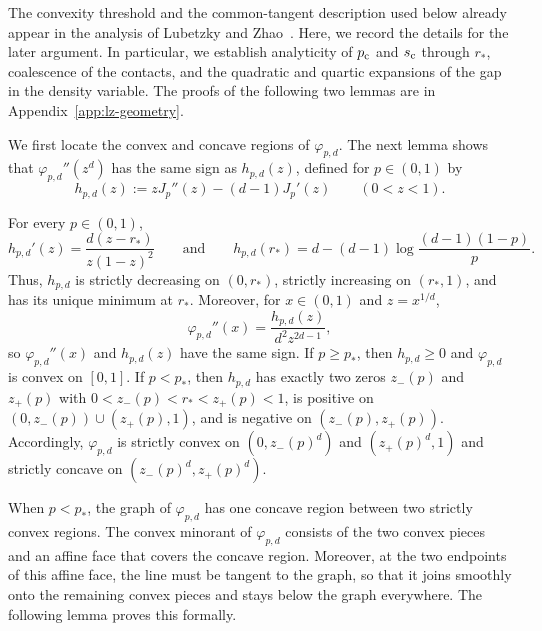 The convexity threshold and the common-tangent description used
below already appear in the analysis of Lubetzky and Zhao~\cite[Appendix~A]{lubetzky2015large}.
Here, we record the details for the later argument.  In particular, we establish
analyticity of $\pc$ and $\sc$ through $r_*$, coalescence of the contacts, and the
quadratic and quartic expansions of the gap in the density variable.
The proofs of the following two lemmas are in
Appendix~\ref{app:lz-geometry}.

We first locate the convex and concave regions of $\varphi_{p,d}$.
The next lemma shows that $\varphi_{p,d}''(z^d)$ has the same sign as
$h_{p,d}(z)$, defined for $p\in(0,1)$ by
\[
  h_{p,d}(z):=zJ_p''(z)-(d-1)J_p'(z)
  \qquad (0<z<1).
\]

\begin{lemma}\label{lem:convexity-defect}
For every $p\in(0,1)$,
\[
  h_{p,d}'(z)=\frac{d(z-r_*)}{z(1-z)^2}
  \qquad\text{and}\qquad
  h_{p,d}(r_*)=d-(d-1)\log\frac{(d-1)(1-p)}{p}.
\]
Thus, $h_{p,d}$ is strictly decreasing on $(0,r_*)$, strictly increasing on
$(r_*,1)$, and has its unique minimum at $r_*$.  Moreover, for
$x\in(0,1)$ and $z=x^{1/d}$,
\[
  \varphi_{p,d}''(x)=\frac{h_{p,d}(z)}{d^2z^{2d-1}},
\]
so $\varphi_{p,d}''(x)$ and $h_{p,d}(z)$ have the same sign.  If $p\ge p_*$,
then $h_{p,d}\ge0$ and $\varphi_{p,d}$ is convex on $[0,1]$.  If $p<p_*$,
then $h_{p,d}$ has exactly two zeros $z_-(p)$ and $z_+(p)$ with $0<z_-(p)<r_*<z_+(p)<1$,
is positive on $(0,z_-(p))\cup(z_+(p),1)$, and is negative on
$(z_-(p),z_+(p))$.  Accordingly, $\varphi_{p,d}$ is strictly convex on
$(0,z_-(p)^d)$ and $(z_+(p)^d,1)$ and strictly concave on
$(z_-(p)^d,z_+(p)^d)$.
\end{lemma}

When $p<p_*$, the graph of $\varphi_{p,d}$ has one concave region between two strictly convex regions.
The convex minorant of $\varphi_{p,d}$ consists of the two convex pieces and an affine face that covers the concave region.  
Moreover, at the two endpoints of this affine face, the line must be tangent to the graph, so that it joins smoothly onto the remaining convex pieces and stays below the graph everywhere.
The following lemma proves this formally. 

